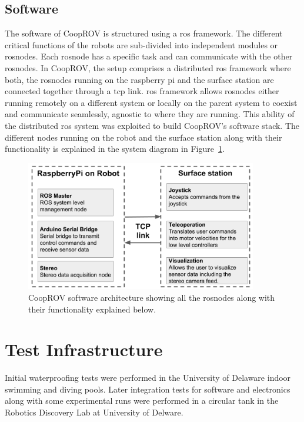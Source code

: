 \documentclass {udthesis}
\begin{document}
\subsection{Software}

The software of CoopROV is structured using a \gls{ros} framework. The different critical functions of the robots are sub-divided into independent modules or rosnodes. Each rosnode has a specific task and can communicate with the other rosnodes. In CoopROV, the setup comprises a distributed \gls{ros} framework where both, the rosnodes running on the raspberry pi and the surface station are connected together through a \gls{tcp} link. \gls{ros} framework allows rosnodes either running remotely on a different system or locally on the parent system to coexist and communicate seamlessly, agnostic to where they are running. This ability of the distributed \gls{ros} system was exploited to build CoopROV's software stack. The different nodes running on the robot and the surface station along with their functionality is explained in the system diagram in Figure~\ref{fig:cooprov_software}.
%
\begin{figure} \label{fig:cooprov_software}
  \centering
  \includegraphics[width=0.9\textwidth]{cooprov_software}
  \caption{CoopROV software architecture showing all the rosnodes along with their functionality explained below.}
\end{figure} 


\section{Test Infrastructure}

Initial waterproofing tests were performed in the University of Delaware indoor swimming and diving pools. Later integration tests for software and electronics along with some experimental runs were performed in a circular tank in the Robotics Discovery Lab at University of Delware.
\end{document}
